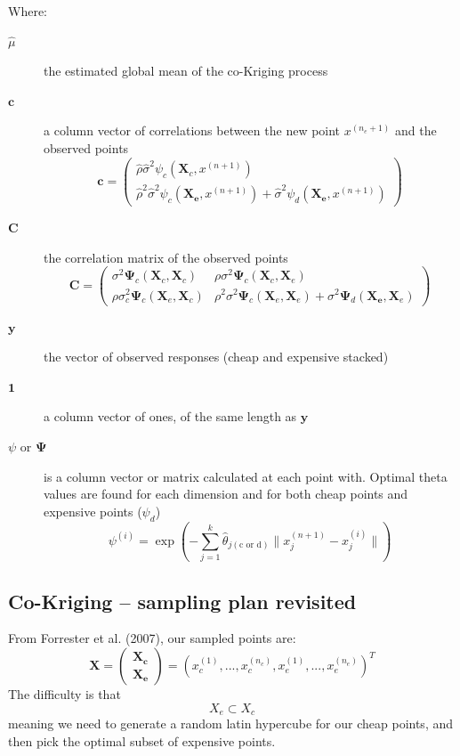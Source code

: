 \documentclass[11pt]{article}
\newcommand{\subentry}[1]{\subsection{#1}}
\theoremstyle{definition}
\begin{document}
Where:
\begin{description}
  \item[$\hat{\mu}$] the estimated global mean of the co-Kriging process
  \item[$\mathbf{c}$] a column vector of correlations between the new point $x^{(n_e+1)}$ and the observed points
  $$\mathbf{c} = 
  \begin{pmatrix} 
    \hat{\rho}\hat{\sigma}^2\psi_c(\mathbf{X}_c,x^{(n+1)}) \\ 
    \hat{\rho}^2\hat{\sigma}^2\psi_c(\mathbf{X_e},x^{(n+1)}) + \hat{\sigma}^2\psi_d(\mathbf{X_e},x^{(n+1)})
  \end{pmatrix}$$
  \item[$\mathbf{C}$] the correlation matrix of the observed points
  $$\mathbf{C} = 
  \begin{pmatrix}
    \sigma^2\mathbf{\Psi}_c(\mathbf{X}_c,\mathbf{X}_c) &\rho\sigma^2\mathbf{\Psi}_c(\mathbf{X}_c,\mathbf{X}_e) \\ 
    \rho\sigma_c^2\mathbf{\Psi}_c(\mathbf{X}_e,\mathbf{X}_c) & \rho^2\sigma^2\mathbf{\Psi}_c(\mathbf{X}_e,\mathbf{X}_e) + \sigma^2\mathbf{\Psi}_d(\mathbf{X_e},\mathbf{X}_e)
  \end{pmatrix}$$
  \item[$\mathbf{y}$] the vector of observed responses (cheap and expensive stacked)
  \item[$\mathbf{1}$] a column vector of ones, of the same length as $\mathbf{y}$
  \item[$\psi$ or $\mathbf{\Psi}$] is a column vector or matrix calculated at each point with. Optimal theta values are found 
  for each dimension and for both cheap points and expensive points ($\psi_d$)
    $$\psi^{(i)} = \exp{(-\sum_{j=1}^{k}\hat{\theta}_{j(\text{c or d})}\|x_j^{(n+1)} - x_j^{(i)}\|)}$$
\end{description}

\subentry{Co-Kriging -- sampling plan revisited}
From Forrester et al. (2007), our sampled points are:
\begin{equation}
  \mathbf{X} = \begin{pmatrix} \mathbf{X_c} \\ \mathbf{X_e} \end{pmatrix} = (x_c^{(1)},...,x_c^{(n_c)},x_e^{(1)},...,x_e^{(n_e)})^T
  \label{eq:co-kriging-sampling}
\end{equation}
The difficulty is that $$X_e \subset X_c$$
meaning we need to generate a random latin hypercube for our cheap points, and then pick the optimal subset of expensive points.
\end{document}
